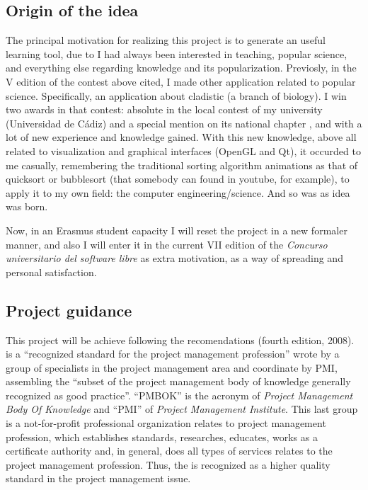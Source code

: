 \documentclass[twocolumn]{article}
\begin{document}
\subsection{Origin of the idea}
The principal motivation for realizing this project is to generate an
useful learning tool, due to I had always been interested in teaching,
popular science, and everything else regarding knowledge and its
popularization. Previosly, in the V edition of the contest above
cited, I made other application related
to popular science. Specifically, an application about cladistic (a branch
of biology). I win two awards in that contest: absolute in
the local contest of my university (Universidad de Cádiz) and a
special mention on its national chapter
, and with a lot of new experience and knowledge
gained. With this new knowledge, above all related to visualization
and graphical interfaces (OpenGL and Qt), it occurded to me casually,
remembering the traditional sorting algorithm animations as that of
quicksort or bubblesort (that somebody can found in youtube, for
example), to apply it to my own field: the computer
engineering/science. And so was as \fav idea was born.

Now, in an Erasmus student capacity I will reset the project in a new
formaler manner, and also I will enter it in the current VII
edition of the \textit{Concurso universitario del software libre} as
extra motivation, as a way of spreading and personal satisfaction.

\subsection{Project guidance}
This project will be achieve following the \pmbok
recomendations (fourth edition, 2008). \pmbok is a ``recognized
standard for the
project management profession'' wrote by a group of specialists in the
project management area and coordinate by PMI, assembling the ``subset of
the project management body of knowledge generally recognized as good
practice''. ``PMBOK'' is the acronym of \textit{Project Management
  Body Of Knowledge} and ``PMI'' of \textit{Project Management
  Institute}. This last group is a not-for-profit professional
organization relates to project management profession, which
establishes standards, researches, educates, works as a certificate
authority and, in general, does all types of services relates to the
project management profession. Thus, the \pmbok is recognized as
a higher quality standard in the project management issue.
\end{document}
